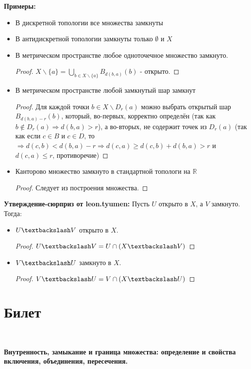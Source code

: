\documentclass[a4paper,100pt]{article}
\theoremstyle{indented}
\begin{document}
\textbf{Примеры:} 
\begin{itemize}
 \item В дискретной топологии все множества замкнуты
 \item В антидискретной топологии замкнуты только $\emptyset$ и $X$
 \item В метрическом пространстве любое одноточечное множество замкнуто.
 \begin{proof}
    $X \backslash \{a\}=\bigcup_{b \in X \backslash \{a\}} B_{d(b, a)}(b)$ - открыто.
 \end{proof}
 \item В метрическом пространстве любой замкнутый шар замкнут
 \begin{proof}
    Для каждой точки $b \in X \backslash D_r(a)$ можно выбрать открытый шар $B_{d(b, a)-r}(b)$, который, во-первых, корректно определён (так как $b \notin D_r(a) \Rightarrow d(b, a) > r$), а во-вторых, не содержит точек из $D_r(a)$ (так как если $c \in B$ и $c \in D$, то $\Rightarrow d(c, b) < d(b, a)-r \Rightarrow d(c, a) \geq d(c, b) + d(b, a) > r$ и $ d(c, a) \leq r$, противоречие)
 \end{proof}
 \item Канторово множество замкнуто в стандартной топологи на $\mathbb{R}$
 \begin{proof}
    Следует из построения множества.
 \end{proof}
\end{itemize}

\textbf{Утверждение-сюрприз от leon.tyumen: }Пусть $U$ открыто в $X$, а $V$ замкнуто. Тогда:
\begin{itemize}
    \item $U \textbackslash V$ открыто в $X$.
    \begin{proof}
     $U \textbackslash V = U \cap (X \textbackslash V)$
    \end{proof}
    \item $V \textbackslash U$ замкнуто в $X$.
    \begin{proof}
     $V \textbackslash U = V \cap (X \textbackslash U)$
    \end{proof}
\end{itemize}

\section{Билет} \

\medskip
    
\textbf{Внутренность, замыкание и граница множества: определение и свойства включения, объединения, пересечения.} \\
\end{document}
